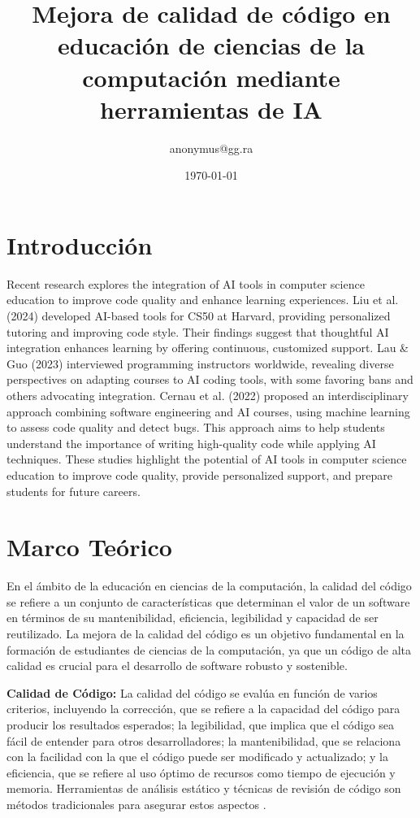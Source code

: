 \documentclass[a4paper,10pt]{article}
\title{Mejora de calidad de código en educación de ciencias de la computación mediante herramientas de IA}
\author{anonymus@gg.ra}
\date{\today}
\begin{document}
\maketitle

\tableofcontents
\newpage

\section{Introducción}

Recent research explores the integration of AI tools in computer science education to improve code quality and enhance learning experiences. Liu et al. (2024) \cite{Liu2024TeachingCW} developed AI-based tools for CS50 at Harvard, providing personalized tutoring and improving code style. Their findings suggest that thoughtful AI integration enhances learning by offering continuous, customized support. Lau \& Guo (2023) \cite{Lau2023FromI} interviewed programming instructors worldwide, revealing diverse perspectives on adapting courses to AI coding tools, with some favoring bans and others advocating integration. Cernau et al. (2022) \cite{Cernau2022APA} proposed an interdisciplinary approach combining software engineering and AI courses, using machine learning to assess code quality and detect bugs. This approach aims to help students understand the importance of writing high-quality code while applying AI techniques. These studies highlight the potential of AI tools in computer science education to improve code quality, provide personalized support, and prepare students for future careers.

\newpage
\section{Marco Teórico}

En el ámbito de la educación en ciencias de la computación, la calidad del código se refiere a un conjunto de características que determinan el valor de un software en términos de su mantenibilidad, eficiencia, legibilidad y capacidad de ser reutilizado. La mejora de la calidad del código es un objetivo fundamental en la formación de estudiantes de ciencias de la computación, ya que un código de alta calidad es crucial para el desarrollo de software robusto y sostenible.

\textbf{Calidad de Código:} La calidad del código se evalúa en función de varios criterios, incluyendo la corrección, que se refiere a la capacidad del código para producir los resultados esperados; la legibilidad, que implica que el código sea fácil de entender para otros desarrolladores; la mantenibilidad, que se relaciona con la facilidad con la que el código puede ser modificado y actualizado; y la eficiencia, que se refiere al uso óptimo de recursos como tiempo de ejecución y memoria. Herramientas de análisis estático y técnicas de revisión de código son métodos tradicionales para asegurar estos aspectos \cite{puryear2022github}.
\end{document}
